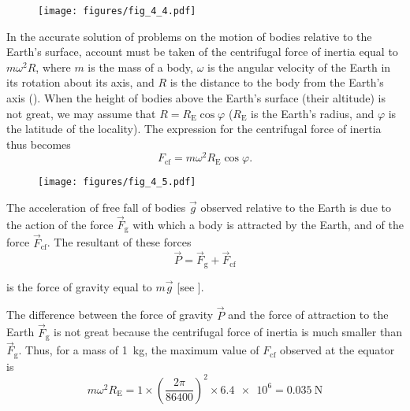 \begin{figure}[t]
	\begin{center}
		\texttt{[image: figures/fig\_4\_4.pdf]}
		\caption[]{}
		\label{fig:4_4}
	\end{center}
\end{figure}

In the accurate solution of problems on the motion of bodies relative to the Earth's surface, account must be taken of the centrifugal force of inertia equal to $m\omega^2R$, where $m$ is the mass of a body, $\omega$ is the angular velocity of the Earth in its rotation about its axis, and $R$ is the distance to the body from the Earth's axis (). When the height of bodies above the Earth's surface (their altitude) is not great, we may assume that $R=R_{\text{E}}\cos\varphi$ ($R_{\text{E}}$ is the Earth's radius, and $\varphi$ is the latitude of the locality). The expression for the centrifugal force of inertia thus becomes
\begin{equation}\label{eq:4_7}
F_{\text{cf}} = m\omega^2 R_{\text{E}}\cos\varphi.
\end{equation}

\begin{figure}[t]
	\begin{center}
		\texttt{[image: figures/fig\_4\_5.pdf]}
		\caption[]{}
		\label{fig:4_5}
	\end{center}
\end{figure}

The acceleration of free fall of bodies $\vec{g}$ observed relative to the Earth is due to the action of the force $\vec{F}_{\text{g}}$ with which a body is attracted by the Earth, and of the force $\vec{F}_{\text{cf}}$. The resultant of these forces
\begin{equation}\label{eq:4_8}
\vec{P} = \vec{F}_{\text{g}} + \vec{F}_{\text{cf}}
\end{equation}

\noindent
is the force of gravity equal to $m\vec{g}$ [see ].

The difference between the force of gravity $\vec{P}$ and the force of attraction to the Earth $\vec{F}_{\text{g}}$ is not great because the centrifugal force of inertia is much smaller than $\vec{F}_{\text{g}}$. Thus, for a mass of \SI{1}{\kilo\gram}, the maximum value of $F_{\text{cf}}$ observed at the equator is
\begin{equation*}
m\omega^2 R_{\text{E}} = 1 \times \left(\frac{2\pi}{86400}\right)^2 \times \num{6.4e6} = \SI{0.035}{\newton}
\end{equation*}

